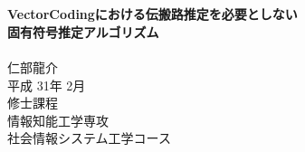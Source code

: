 \documentclass[11pt,oneside,titlepage]{jsbook}
\begin{document}
\captiondelim{ }%
\rhead{\textbf{\thepage}}　　　%
\cfoot{}　　　　　　　　　　　%
\renewcommand{\headrulewidth}{0.4pt}
\renewcommand{\footrulewidth}{0.4pt}
\setlength{\baselineskip}{18.95pt}

\makeatletter
\renewcommand{\chapter}{
  \if@openright\cleardoublepage\else\clearpage\fi
  \global\@topnum\z@
  \secdef\@chapter\@schapter}
\makeatother

\vspace*{3cm}%
\begin{center}%
{\Large \textbf{}}\\%
\vspace{3mm}
{\Large \textbf{VectorCodingにおける伝搬路推定を必要としない\\固有符号推定アルゴリズム}} \\
\vspace{5cm}%
\indent \\
{\Large 仁部龍介} \\
\vspace{5mm}
{\Large 平成 31年 2月} \\
\vspace{5mm}
{\Large 修士課程 \\ 情報知能工学専攻 \\ 社会情報システム工学コース} \\
\end{center}%
\thispagestyle{empty}%


%

\frontmatter %
\clearpage %
\tableofcontents %
\rhead{}

\mainmatter %

\newpage
\rhead{\thepage}

\backmatter          %
%
\end{document}
